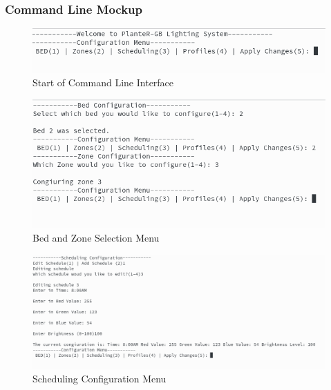 \documentclass[onecolumn, draftclsnofoot,10pt, compsoc]{IEEEtran}
\begin{document}
			            \subsubsection{Command Line Mockup}
			            \begin{center}
			                \begin{figure}[H]
			                    \includegraphics[width=\linewidth]{comand_line_interface/Selection_006.png}
			                    \caption{Start of Command Line Interface}
			                    \label{fig:Start of Command Line Interface}
			                \end{figure}

			                \begin{figure}[H]
			                    \includegraphics[width=\linewidth]{comand_line_interface/Selection_003.png}
			                    \caption{Bed and Zone Selection Menu}
			                    \label{fig:Bed and Zone Selection Menu}
			                \end{figure}

			            \begin{figure}[H]
			                \includegraphics[width=\linewidth]{comand_line_interface/Selection_004.png}
			                \caption{Scheduling Configuration Menu}
			                \label{fig:Scheduling Configuration Menu}
			            \end{figure}


\end{center}
\end{document}
